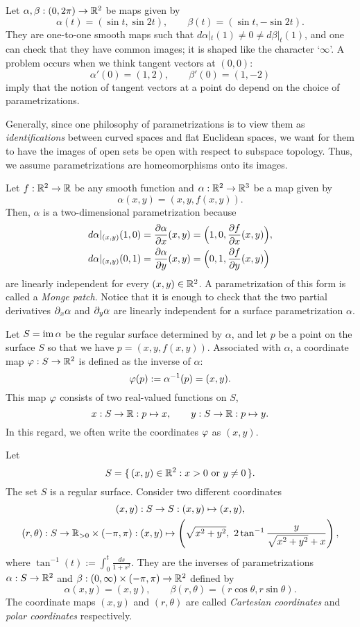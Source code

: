 \documentclass{../exp}
\def\a{\alpha}
\begin{document}
\begin{exs}
\item
Let $\a,\beta:(0,2\pi)\to\R^2$ be maps given by
\[\a(t)=(\sin t,\sin2t),\qquad\beta(t)=(\sin t,-\sin2t).\]
They are one-to-one smooth maps such that $d\a|_t(1)\ne0\ne d\beta|_t(1)$, and one can check that they have common images; it is shaped like the character `$\infty$'.
A problem occurs when we think tangent vectors at $(0,0)$:
\[\a'(0)=(1,2),\qquad\beta'(0)=(1,-2)\]
imply that the notion of tangent vectors at a point do depend on the choice of parametrizations.

Generally, since one philosophy of parametrizations is to view them as \emph{identifications} between curved spaces and flat Euclidean spaces, we want for them to have the images of open sets be open with respect to subspace topology.
Thus, we assume parametrizations are homeomorphisms onto its images.

\item
Let $f:\R^2\to\R$ be any smooth function and $\a:\R^2\to\R^3$ be a map given by
\[\a(x,y)=(x,y,f(x,y)).\]
Then, $\a$ is a two-dimensional parametrization because
\begin{align*}
d\a|_{(x,y)}(1,0)&=\pd{\a}{x}(x,y)=\Bigl(1,0,\pd{f}{x}(x,y)\Bigr),\\
d\a|_{(x,y)}(0,1)&=\pd{\a}{y}(x,y)=\Bigl(0,1,\pd{f}{y}(x,y)\Bigr)
\end{align*}
are linearly independent for every $(x,y)\in\mathbb{R}^2$.
A parametrization of this form is called a \emph{Monge patch}.
Notice that it is enough to check that the two partial derivatives $\pd_x\a$ and $\pd_y\a$ are linearly independent for a surface parametrization $\a$.

Let $S=\im\a$ be the regular surface determined by $\a$, and let $p$ be a point on the surface $S$ so that we have $p=(x,y,f(x,y))$.
Associated with $\a$, a coordinate map $\f:S\to\R^2$ is defined as the inverse of $\a$:
\[\f(p):=\a^{-1}(p)=(x,y).\]
This map $\varphi$ consists of two real-valued functions on $S$,
\[x:S\to\R:p\mapsto x,\qquad y:S\to\R:p\mapsto y.\]
In this regard, we often write the coordinates $\varphi$ as $(x,y)$.

\item
Let
\[S=\{\,(x,y)\in\mathbb{R}^2:x>0\text{ or }y\ne0\,\}.\]
The set $S$ is a regular surface.
Consider two different coordinates
\begin{gather*}
(x,y):S\to S:(x,y)\mapsto(x,y),\\
(r,\theta):S\to\R_{>0}\times(-\pi,\pi):(x,y)\mapsto\left(\sqrt{x^2+y^2},\ 2\tan^{-1}\frac y{\sqrt{x^2+y^2}+x}\right),
\end{gather*}
where $\tan^{-1}(t):=\int_0^t\frac{ds}{1+s^2}$.
They are the inverses of parametrizations $\a:S\to\R^2$ and $\beta:(0,\infty)\times(-\pi,\pi)\to\R^2$ defined by
\[\a(x,y)=(x,y),\qquad\beta(r,\theta)=(r\cos\theta,r\sin\theta).\]
The coordinate maps $(x,y)$ and $(r,\theta)$ are called \emph{Cartesian coordinates} and \emph{polar coordinates} respectively.
\end{exs}
\end{document}
